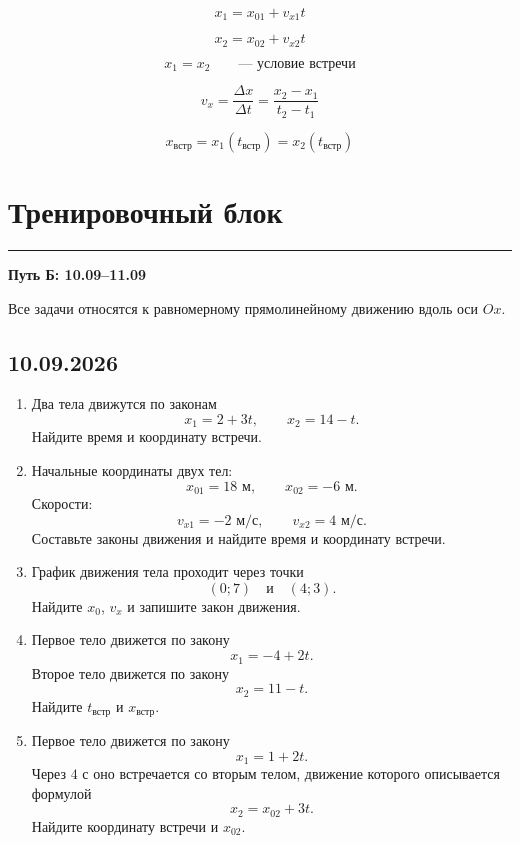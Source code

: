 \documentclass[a4paper,12pt]{article}
\newcommand{\sectionline}{%
    \vspace{-0.4em}
    {\color{accent}\rule{\linewidth}{0.7pt}}
    \vspace{0.4em}
}
\begin{document}
\[
\boxed{x_1=x_{01}+v_{x1}t}
\]

\[
\boxed{x_2=x_{02}+v_{x2}t}
\]

\[
\boxed{x_1=x_2}
\qquad
\text{--- условие встречи}
\]

\[
\boxed{
v_x=\frac{\Delta x}{\Delta t}
=
\frac{x_2-x_1}{t_2-t_1}
}
\]

\[
\boxed{
x_{\text{встр}}
=
x_1(t_{\text{встр}})
=
x_2(t_{\text{встр}})
}
\]


\clearpage

\section*{\color{darkaccent}Тренировочный блок}
\sectionline

\begin{center}
{\large\textbf{Путь Б: 10.09--11.09}}
\end{center}

Все задачи относятся к равномерному прямолинейному движению вдоль оси \(Ox\).

\subsection*{\color{darkaccent}10.09.2026}

\begin{enumerate}
    \item Два тела движутся по законам
    \[
    x_1=2+3t,
    \qquad
    x_2=14-t.
    \]
    Найдите время и координату встречи.

    \item Начальные координаты двух тел:
    \[
    x_{01}=18\text{ м},
    \qquad
    x_{02}=-6\text{ м}.
    \]
    Скорости:
    \[
    v_{x1}=-2\text{ м/с},
    \qquad
    v_{x2}=4\text{ м/с}.
    \]
    Составьте законы движения и найдите время и координату встречи.

    \item График движения тела проходит через точки
    \[
    (0;7)
    \quad\text{и}\quad
    (4;3).
    \]
    Найдите \(x_0\), \(v_x\) и запишите закон движения.

    \item Первое тело движется по закону
    \[
    x_1=-4+2t.
    \]
    Второе тело движется по закону
    \[
    x_2=11-t.
    \]
    Найдите \(t_{\text{встр}}\) и \(x_{\text{встр}}\).

    \item Первое тело движется по закону
    \[
    x_1=1+2t.
    \]
    Через \(4\) с оно встречается со вторым телом, движение которого описывается формулой
    \[
    x_2=x_{02}+3t.
    \]
    Найдите координату встречи и \(x_{02}\).
\end{enumerate}
\end{document}

